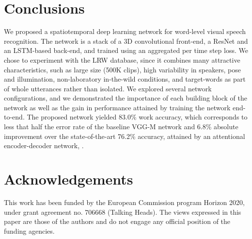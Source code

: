 \documentclass[a4paper]{article}
\begin{document}
\section{Conclusions}
We proposed a spatiotemporal deep learning network for word-level visual speech recognition. The network is a stack of a 3D convolutional front-end, a ResNet and an LSTM-based back-end, and trained using an aggregated per time step loss. We chose to experiment with the LRW database, since it combines many attractive characteristics, such as large size (500K clips), high variability in speakers, pose and illumination, non-laboratory in-the-wild conditions, and target-words as part of whole utterances rather than isolated. We explored several network configurations, and we demonstrated the importance of each building block of the network as well as the gain in performance attained by training the network end-to-end. The proposed network yielded 83.0\% work accuracy, which corresponds to less that half the error rate of the baseline VGG-M network and 6.8\% absolute improvement over the state-of-the-art 76.2\% accuracy, attained by an attentional encoder-decoder network, \cite{chung2016lipsent} \cite{chung2016lip}.        
\section{Acknowledgements}
This work has been funded by the European Commission program Horizon 2020, under grant agreement no. 706668 (Talking Heads). The views expressed in this paper are those of the authors and do not engage any official position of the funding agencies.




\end{document}
